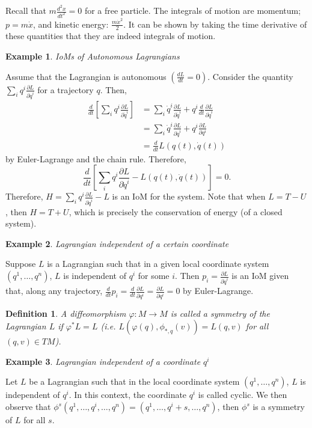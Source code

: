 \documentclass{article}
\newcommand{\nl}{\newline\newline\noindent}
\newcommand{\vhi}{\varphi}
\newcommand{\pdof}[2]{\frac{\partial #1}{\partial #2}}
\newtheorem{ex}{Example}
\newtheorem{defn}{Definition}
\begin{document}
Recall that $m\frac{d^2x}{dt^2} = 0$ for a free particle. The integrals of motion are momentum; $p=m\dot x$, and kinetic energy: $\frac{m\dot x^2}{2}$. It can be shown by taking the time derivative of these quantities that they are indeed integrals of motion.
\begin{ex}
    IoMs of Autonomous Lagrangians
\end{ex}
Assume that the Lagrangian is autonomous $(\frac{dL}{dt} = 0)$. Consider the quantity $\sum_i q^i\pdof{L}{\dot q^i}$ for a trajectory $q$. Then,
\begin{align*}
    \frac{d}{dt}\left[\sum_i q^i\pdof{L}{\dot q^i}\right]&=\sum_{i}\dot q^i\pdof{L}{\dot q^i} + q^i\frac{d}{dt}\pdof{L}{\dot q^i}\\
    &=\sum_{i}\dot q^i\pdof{L}{\dot q^i} + q^i\pdof{L}{q^i}\\
    &=\frac{d}{dt}L(q(t),\dot q(t))
\end{align*}
by Euler-Lagrange and the chain rule. Therefore,
\[\frac{d}{dt}\left[\sum_iq^i\pdof{L}{\dot q^i} - L(q(t),\dot q(t))\right] = 0.\]
Therefore, $H = \sum_iq^i\pdof{L}{\dot q^i} - L$ is an IoM for the system. Note that when $L=T-U$, then $H = T+U$, which is precisely the conservation of energy (of a closed system).
\begin{ex}
    Lagrangian independent of a certain coordinate
\end{ex}
Suppose $L$ is a Lagrangian such that in a given local coordinate system $(q^1,\dots,q^n)$, $L$ is independent of $q^i$ for some $i$. Then $p_i = \pdof{L}{\dot q^i}$ is an IoM given that, along any trajectory, $\frac{d}{dt}p_i = \frac{d}{dt}\pdof{L}{q^i} = \pdof{L}{q^i} = 0$ by Euler-Lagrange.
\nl
\begin{defn}
    A diffeomorphism $\vhi:M\to M$ is called a symmetry of the Lagrangian $L$ if $\vhi^*L = L$ (i.e. $L(\vhi(q),\phi_{*,q}(v)) = L(q,v)$ for all $(q,v)\in TM$).
\end{defn}
\begin{ex}
    Lagrangian independent of a coordinate $q^i$
\end{ex}
Let $L$ be a Lagrangian such that in the local coordinate system $(q^1,\dots,q^n)$, $L$ is independent of $q^i$. In this context, the coordinate $q^i$ is called cyclic. We then observe that $\phi^s(q^1,\dots,q^i,\dots,q^n) = (q^1,\dots,q^i+s,\dots,q^n)$, then $\phi^s$ is a symmetry of $L$ for all $s$.
\end{document}

